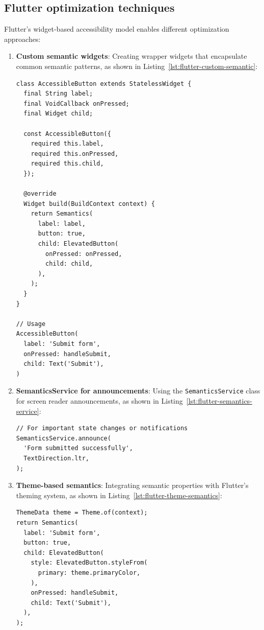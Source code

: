 \subsection{Flutter optimization techniques}
\label{subsec:flutter-optimization}

Flutter's widget-based accessibility model enables different optimization approaches:

\begin{enumerate}
    \item \textbf{Custom semantic widgets}: Creating wrapper widgets that encapsulate common semantic patterns, as shown in Listing~\ref{lst:flutter-custom-semantic}:
    
    \begin{lstlisting}[style=DartStyle, caption=Custom semantic widget in Flutter, label=lst:flutter-custom-semantic]
class AccessibleButton extends StatelessWidget {
  final String label;
  final VoidCallback onPressed;
  final Widget child;

  const AccessibleButton({
    required this.label,
    required this.onPressed,
    required this.child,
  });

  @override
  Widget build(BuildContext context) {
    return Semantics(
      label: label,
      button: true,
      child: ElevatedButton(
        onPressed: onPressed,
        child: child,
      ),
    );
  }
}

// Usage
AccessibleButton(
  label: 'Submit form',
  onPressed: handleSubmit,
  child: Text('Submit'),
)
    \end{lstlisting}

\pagebreak
    
    \item \textbf{SemanticsService for announcements}: Using the \texttt{SemanticsService} class for screen reader announcements, as shown in Listing~\ref{lst:flutter-semantics-service}:
    
    \begin{lstlisting}[style=DartStyle, caption=\texttt{SemanticsService} usage in Flutter, label=lst:flutter-semantics-service]
// For important state changes or notifications
SemanticsService.announce(
  'Form submitted successfully',
  TextDirection.ltr,
);
    \end{lstlisting}
    
    \item \textbf{Theme-based semantics}: Integrating semantic properties with Flutter's theming system, as shown in Listing~\ref{lst:flutter-theme-semantics}:
    
    \begin{lstlisting}[style=DartStyle, caption=Theme-based semantics in Flutter, label=lst:flutter-theme-semantics]
ThemeData theme = Theme.of(context);
return Semantics(
  label: 'Submit form',
  button: true,
  child: ElevatedButton(
    style: ElevatedButton.styleFrom(
      primary: theme.primaryColor,
    ),
    onPressed: handleSubmit,
    child: Text('Submit'),
  ),
);
    \end{lstlisting}
\end{enumerate}

